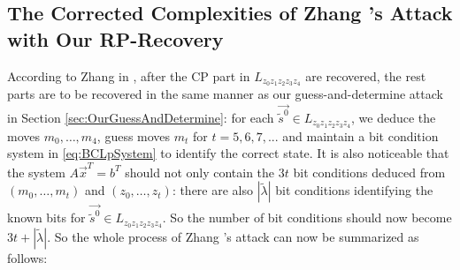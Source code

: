 \subsection{The Corrected Complexities of Zhang \etal's Attack with Our RP-Recovery}\label{sec:OurRpRecovery}
According to Zhang \etal in \cite{AC:Zhang19}, after the CP part in $L_{z_0z_1z_2z_3z_4}$ are recovered, the rest parts are to be recovered in the same manner as our guess-and-determine attack in Section \ref{sec:OurGuessAndDetermine}: for each $\vec{\tilde{s}^0}\in L_{z_0z_1z_2z_3z_4}$, we deduce the moves $m_0,\ldots, m_4$, guess moves $m_t$ for $t=5,6,7,...$ and maintain a bit condition system in \eqref{eq:BCLpSystem} to identify the correct state.
It is also noticeable that the system $A\vec{x}^T=b^T$ should not only contain the $3t$ bit conditions deduced from $(m_0,\ldots, m_t)$ and $(z_0,\ldots, z_t)$: there are also $|\tilde{\lambda}|$ bit conditions identifying the known bits for $\vec{\tilde{s}^0}\in L_{z_0z_1z_2z_3z_4}$. 
So the number of bit conditions should now become $3t+|\tilde{\lambda}|$. 
So the whole process of Zhang \etal's attack can now be summarized as follows:
